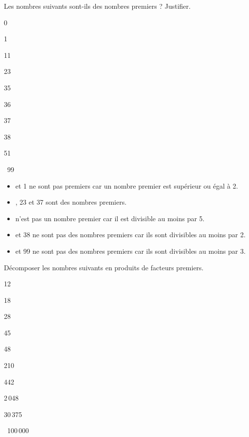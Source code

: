 \exercicesbase

\begin{colonne*exercice}


\begin{exercice} %
   Les nombres suivants sont-ils des nombres premiers ? Justifier.
   \begin{colenumerate}{2}
      \item 0 \smallskip
      \item 1 \smallskip
      \item 11 \smallskip
      \item 23 \smallskip
      \item 35 \smallskip
      \item 36 
      \item 37 
      \item 38 
      \item 51 
      \item \, 99
   \end{colenumerate}
\end{exercice}
 
\begin{corrige}
   \begin{itemize}
      \item { et 1} ne sont pas premiers car un nombre premier est supérieur ou égal à 2. 
      \item {, 23 et 37} sont des nombres premiers.
      \item {} n'est pas un nombre premier car il est divisible au moins par 5.
      \item { et 38} ne sont pas des nombres premiers car ils sont divisibles au moins par 2.
      \item { et 99} ne sont pas des nombres premiers car ils sont divisibles au moins par 3.
   \end{itemize}
\end{corrige}

\bigskip


\begin{exercice} %
   Décomposer les nombres suivants en produits de facteurs premiers.
   \begin{colenumerate}{2}
      \item 12 \smallskip
      \item 18 \smallskip
      \item 28 \smallskip
      \item 45 \smallskip
      \item 48\smallskip
      \item 210
      \item 442
      \item 2\,048
      \item 30\,375
      \item \, 100\,000
   \end{colenumerate}
\end{exercice}


\end{colonne*exercice}

